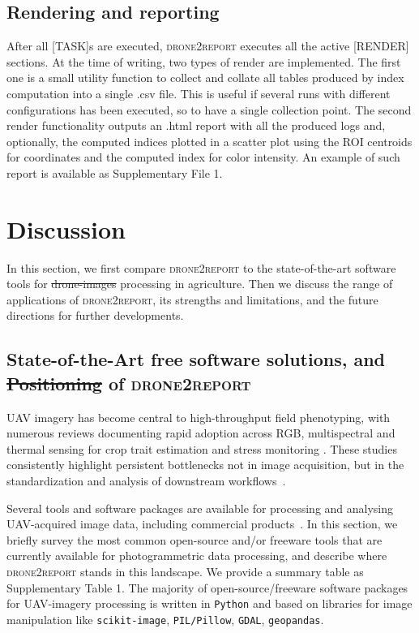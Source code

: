 \documentclass[drones,technicalnote,accept,pdftex,moreauthors]{Definitions/mdpi}
\providecommand{\DIFadd}[1]{{\protect\color{blue}\uwave{#1}}} %
\providecommand{\DIFdel}[1]{{\protect\color{red}\sout{#1}}}                      %
\providecommand{\DIFaddbegin}{} %
\providecommand{\DIFaddend}{} %
\providecommand{\DIFdelbegin}{} %
\providecommand{\DIFdelend}{} %
\newcommand{\DIFscaledelfig}{0.5}
\newlength{\DIFdelgraphicswidth} %
\newlength{\DIFdelgraphicsheight} %
\newcommand{\DIFaddincludegraphics}[2][]{{\color{blue}\fbox{\DIFOincludegraphics[#1]{#2}}}} %
\newcommand{\DIFdelincludegraphics}[2][]{%
\sbox{\DIFdelgraphicsbox}{\DIFOincludegraphics[#1]{#2}}%
\settoboxwidth{\DIFdelgraphicswidth}{\DIFdelgraphicsbox} %
\settoboxtotalheight{\DIFdelgraphicsheight}{\DIFdelgraphicsbox} %
\scalebox{\DIFscaledelfig}{%
\parbox[b]{\DIFdelgraphicswidth}{\usebox{\DIFdelgraphicsbox}\\[-\baselineskip] \rule{\DIFdelgraphicswidth}{0em}}\llap{\resizebox{\DIFdelgraphicswidth}{\DIFdelgraphicsheight}{%
\setlength{\unitlength}{\DIFdelgraphicswidth}%
\begin{picture}(1,1)%
\thicklines\linethickness{2pt} %
{\color[rgb]{1,0,0}\put(0,0){\framebox(1,1){}}}%
{\color[rgb]{1,0,0}\put(0,0){\line( 1,1){1}}}%
{\color[rgb]{1,0,0}\put(0,1){\line(1,-1){1}}}%
\end{picture}%
}\hspace*{3pt}}} %
} %
\DeclareRobustCommand{\DIFaddbegin}{\DIFOaddbegin \let\includegraphics\DIFaddincludegraphics} %
\DeclareRobustCommand{\DIFaddend}{\DIFOaddend \let\includegraphics\DIFOincludegraphics} %
\DeclareRobustCommand{\DIFdelbegin}{\DIFOdelbegin \let\includegraphics\DIFdelincludegraphics} %
\DeclareRobustCommand{\DIFdelend}{\DIFOaddend \let\includegraphics\DIFOincludegraphics} %
\begin{document}
\subsection{Rendering and reporting}
\label{rendering}

After all [TASK]s are executed, \textsc{drone2report} executes all the active [RENDER] sections. At the time of writing, two types of render are implemented. The first one is a small utility function to collect and collate all tables produced by index computation into a single .csv file. This is useful if several runs with different configurations has been executed, so to have a single collection point. The second render functionality outputs an .html report with all the produced logs and, optionally, the computed indices plotted in a scatter plot using the ROI centroids for coordinates and the computed index for color intensity. An example of such report is available as Supplementary File 1.

\section{Discussion}
\label{discussion}
In this section, we first compare \textsc{drone2report} to the state-of-the-art \DIFaddbegin \DIFadd{free }\DIFaddend software tools for \DIFdelbegin \DIFdel{drone-images }\DIFdelend \DIFaddbegin \DIFadd{drone-image }\DIFaddend processing in agriculture. Then we discuss the range of applications of \textsc{drone2report}, its strengths and limitations, and the future directions for further developments.

\subsection{State-of-the-Art free software solutions, and \DIFdelbegin \DIFdel{Positioning }\DIFdelend \DIFaddbegin \DIFadd{positioning }\DIFaddend of \textsc{drone2report}}
UAV imagery has become central to high-throughput field phenotyping, with numerous reviews documenting rapid adoption across RGB, multispectral and thermal sensing for crop trait estimation and stress monitoring \cite{tanaka_review_2024, gano2024drone}. 
These studies consistently highlight persistent bottlenecks not in image acquisition, but in the standardization and analysis of downstream workflows~\cite{gano_dronebased_2024}.

Several tools and software packages are available for processing and analysing UAV-acquired image data, including commercial products~\cite{sharma2021development}. 
In this section, we briefly survey the most common open-source and/or freeware tools that are currently available for photogrammetric data processing, and describe where \textsc{drone2report} stands in this landscape. We provide a summary table as Supplementary Table 1.
The majority of open-source/freeware software packages for UAV-imagery processing is written in \texttt{Python} and based on libraries for image manipulation like \texttt{scikit-image}, \texttt{PIL/Pillow}, \texttt{GDAL}, \texttt{geopandas}.
\end{document}
